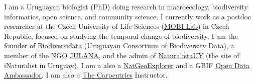\documentclass[9pt]{developercv} %
\begin{document}
%
%	



I am a Uruguayan biologist (PhD) doing research in macroecology, biodiversity informatics, open science, and community science. I currently work as a postdoc researcher at the Czech University of Life Sciences (\href{https://petrkeil.github.io/}{\underline{MOBI Lab}}) in Czech Republic, focused on studying the temporal change of biodiversity. I am the founder of \href{https://biodiversidata.org/}{\underline{Biodiversidata}} (Uruguayan Consortium of Biodiversity Data), a member of the NGO \href{https://julana.org/}{\underline{JULANA}}, and the admin of \href{https://www.naturalista.uy/}{\underline{NaturalistaUY}} (the site of iNaturalist in Uruguay). I am a also a \href{https://explorers.nationalgeographic.org/directory/florencia-grattarola}{\underline{NatGeoExplorer}} and a GBIF \href{https://www.gbif.org/article/1ye7qAa9Z2HVSn85bfSmLP/who-are-the-gbif-biodiversity-open-data-ambassadors}{\underline{Open Data Ambassador}}. I am also a \href{https://carpentries.org}{\underline{The Carpentries}} Instructor. \\\
\end{document}
